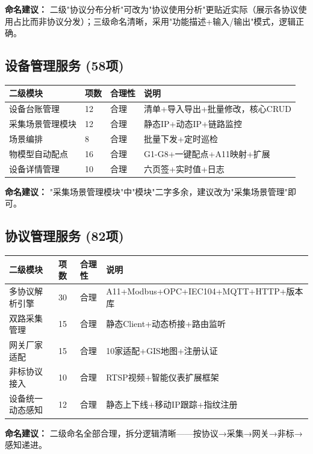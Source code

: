 \documentclass[11pt,a4paper]{ctexart}
\begin{document}
\textbf{命名建议：} 二级"协议分布分析"可改为"协议使用分析"更贴近实际（展示各协议使用占比而非协议分发）；三级命名清晰，采用"功能描述+输入/输出"模式，逻辑正确。

\subsection{设备管理服务 (58项)}

\begin{longtable}{p{3.5cm}p{2.5cm}p{2cm}p{4.5cm}}
\toprule\textbf{二级模块} & \textbf{项数} & \textbf{合理性} & \textbf{说明}\\\midrule
设备台账管理 & 12 & \color{ok}合理 & 清单+导入导出+批量修改，核心CRUD \\
采集场景管理模块 & 12 & \color{ok}合理 & 静态IP+动态IP+链路监控 \\
场景编排 & 8 & \color{ok}合理 & 批量下发+定时巡检 \\
物模型自动配点 & 16 & \color{ok}合理 & G1-G8+一键配点+A11映射+扩展 \\
设备详情管理 & 10 & \color{ok}合理 & 六页签+实时值+日志 \\\bottomrule
\end{longtable}

\textbf{命名建议：} "采集场景管理模块"中"模块"二字多余，建议改为"采集场景管理"即可。

\subsection{协议管理服务 (82项)}

\begin{longtable}{p{3.5cm}p{2.5cm}p{2cm}p{4.5cm}}
\toprule\textbf{二级模块} & \textbf{项数} & \textbf{合理性} & \textbf{说明}\\\midrule
多协议解析引擎 & 30 & \color{ok}合理 & A11+Modbus+OPC+IEC104+MQTT+HTTP+版本库 \\
双路采集管理 & 15 & \color{ok}合理 & 静态Client+动态桥接+路由监听 \\
网关厂家适配 & 15 & \color{ok}合理 & 10家适配+GIS地图+注册认证 \\
非标协议接入 & 10 & \color{ok}合理 & RTSP视频+智能仪表扩展框架 \\
设备统一动态感知 & 12 & \color{ok}合理 & 静态上下线+移动IP跟踪+指纹注册 \\\bottomrule
\end{longtable}

\textbf{命名建议：} 二级命名全部合理，拆分逻辑清晰——按协议→采集→网关→非标→感知递进。
\end{document}
